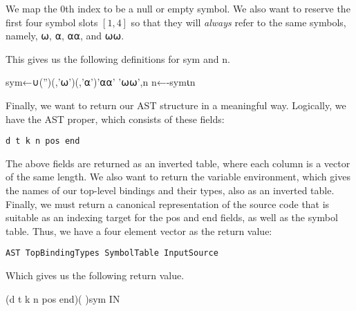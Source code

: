 \documentclass{article}%
\begin{document}
We map the $0$th index to be a null or empty symbol. 
We also want to reserve the first four symbol slots $[1,4]$
so that they will \emph{always} refer to the same symbols, 
namely, {\Tt{}⍵\nwendquote}, {\Tt{}⍺\nwendquote}, {\Tt{}⍺⍺\nwendquote}, and {\Tt{}⍵⍵\nwendquote}. 

This gives us the following definitions for {\Tt{}sym\nwendquote} and {\Tt{}n\nwendquote}.

\nwenddocs{}\plusendmoddef\nwstartdeflinemarkup{}\nwenddeflinemarkup
sym←∪('')(,'⍵')(,'⍺')'⍺⍺' '⍵⍵',n
n←-sym⍳n
\nwendcode{}\nwdocspar

Finally, we want to return our AST structure in a meaningful way.
Logically, we have the AST proper, which consists of these fields:

\begin{verbatim}
d t k n pos end
\end{verbatim}

\noindent
The above fields are returned as an inverted table,
where each column is a vector of the same length.
We also want to return the variable environment,
which gives the names of our top-level bindings and their types,
also as an inverted table.
Finally, we must return a canonical representation of the source 
code that is suitable as an indexing target for the {\Tt{}pos\nwendquote} and {\Tt{}end\nwendquote}
fields, as well as the symbol table.
Thus, we have a four element vector as the return value:

\begin{verbatim}
AST TopBindingTypes SymbolTable InputSource
\end{verbatim}

\noindent
Which gives us the following return value.

\nwenddocs{}\plusendmoddef\nwstartdeflinemarkup{}\nwenddeflinemarkup
(d t k n pos end)( )sym IN
\nwendcode{}\nwdocspar
\end{document}
